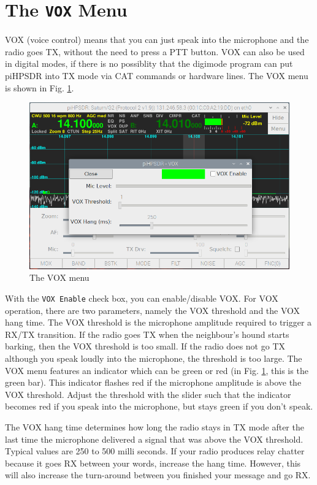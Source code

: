 \documentclass[12pt]{book}
\def\rett#1{\texttt{\color{red}#1}}
\begin{document}
\section{The \texttt{VOX} Menu}

VOX (voice control) means that you can just speak into the microphone and the
radio goes TX, without the need to press a PTT button. VOX can also be used
in digital modes, if there is no possiblity that the digimode program can
put piHPSDR into TX mode via CAT commands or hardware lines. The VOX menu
is shown in Fig. \ref{fig:VOXMenu}.

\begin{figure}[ht]
\center
\includegraphics[width=12cm]{VOXMenu.png}
\caption{The VOX menu}
\label{fig:VOXMenu}
\end{figure}

With the \rett{VOX Enable} check box, you can enable/disable VOX. For VOX operation,
there are two parameters, namely the VOX threshold and the VOX hang time. The VOX threshold
is the microphone amplitude required to trigger a RX/TX transition. If the radio goes TX
when the neighbour's hound starts barking, then the VOX threshold is too small. If the radio
does not go TX  although you speak loudly into the microphone, the threshold is too large.
The VOX menu features an indicator which can be green or red (in Fig. \ref{fig:VOXMenu}, this
is the green bar). This indicator flashes red if the microphone amplitude is above the VOX
threshold. Adjust the threshold with the slider such that the indicator becomes red if  you
speak into the microphone, but stays green if you don't speak.

The VOX hang time determines how long the radio stays in TX mode after the last time the
microphone delivered a signal that was above the VOX threshold. Typical values are 250 to
500 milli seconds. If your radio produces relay chatter because it goes RX between your words,
increase the hang time. However, this will also increase the turn-around between you finished
your message and go RX.
\end{document}
